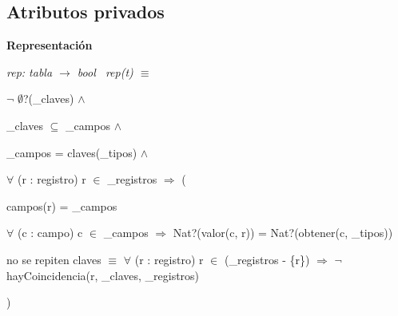 \subsection*{Atributos privados}
\begin{Indent}\textbf{ Representación}\par
{\em rep\+: tabla $\to$ bool~\newline
rep(t) $\equiv$
\begin{DoxyItemize}
\item $\lnot$ $\emptyset$?(\+\_\+claves) $\land$
\item \+\_\+claves $\subseteq$ \+\_\+campos $\land$
\item \+\_\+campos = claves(\+\_\+tipos) $\land$
\item $\forall$ (r \+: registro) r $\in$ \+\_\+registros $\Rightarrow$ (
\begin{DoxyItemize}
\item campos(r) = \+\_\+campos
\item $\forall$ (c \+: campo) c $\in$ \+\_\+campos $\Rightarrow$ Nat?(valor(c, r)) = Nat?(obtener(c, \+\_\+tipos))
\item no se repiten claves $\equiv$ $\forall$ (r\textquotesingle{} \+: registro) r $\in$ (\+\_\+registros -\/ \{r\}) $\Rightarrow$ $\lnot$ hay\+Coincidencia(r, \+\_\+claves, \+\_\+registros)
\end{DoxyItemize}
\item )
\end{DoxyItemize}

}
\end{Indent}
